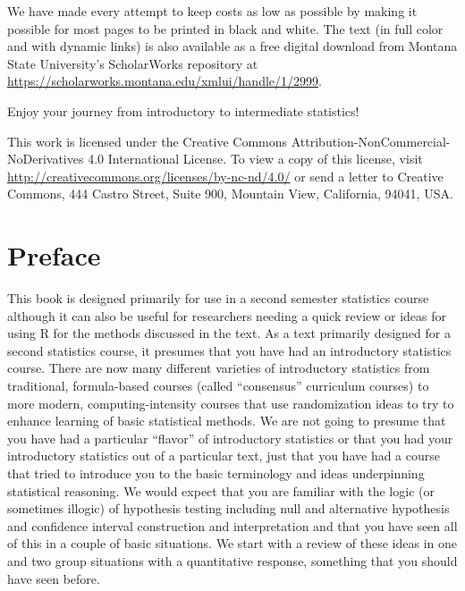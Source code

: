 \documentclass[]{book}
\begin{document}
We have made every attempt to keep costs as low as possible by making it
possible for most pages to be printed in black and white. The text (in
full color and with dynamic links) is also available as a free digital
download from Montana State University's ScholarWorks repository at
\url{https://scholarworks.montana.edu/xmlui/handle/1/2999}.

Enjoy your journey from introductory to intermediate statistics!

This work is licensed under the Creative Commons
Attribution-NonCommercial-NoDerivatives 4.0 International License. To
view a copy of this license, visit
\url{http://creativecommons.org/licenses/by-nc-nd/4.0/} or send a letter
to Creative Commons, 444 Castro Street, Suite 900, Mountain View,
California, 94041, USA.

\chapter{Preface}\label{preface}

This book is designed primarily for use in a second semester statistics
course although it can also be useful for researchers needing a quick
review or ideas for using R for the methods discussed in the text. As a
text primarily designed for a second statistics course, it presumes that
you have had an introductory statistics course. There are now many
different varieties of introductory statistics from traditional,
formula-based courses (called ``consensus'' curriculum courses) to more
modern, computing-intensity courses that use randomization ideas to try
to enhance learning of basic statistical methods. We are not going to
presume that you have had a particular ``flavor'' of introductory
statistics or that you had your introductory statistics out of a
particular text, just that you have had a course that tried to introduce
you to the basic terminology and ideas underpinning statistical
reasoning. We would expect that you are familiar with the logic (or
sometimes illogic) of hypothesis testing including null and alternative
hypothesis and confidence interval construction and interpretation and
that you have seen all of this in a couple of basic situations. We start
with a review of these ideas in one and two group situations with a
quantitative response, something that you should have seen before.
\end{document}
